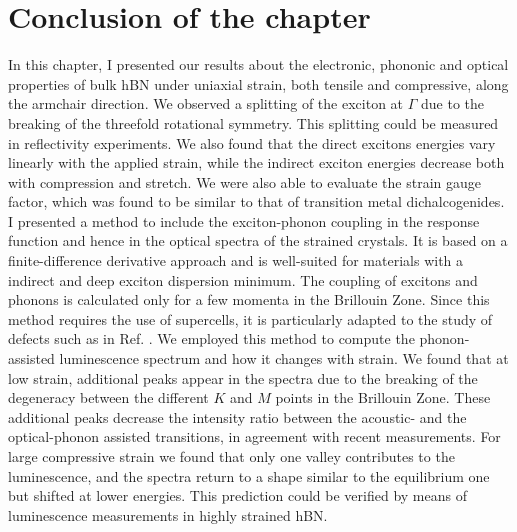 %
\section*{Conclusion of the chapter}
In this chapter, I presented our results about the electronic, phononic and optical properties of bulk hBN under uniaxial strain, both tensile and compressive, along the armchair direction. We observed a splitting of the exciton at $\Gamma$ due to the breaking
of the threefold rotational symmetry. This splitting could be measured in reflectivity experiments.\cite{elias2021flat} We also found that the direct excitons energies vary linearly with the applied strain, while the indirect exciton energies decrease both with compression and stretch. We were also able to evaluate the strain gauge factor, which was found to be similar to that of transition metal dichalcogenides.
I presented a method to include the exciton-phonon coupling in the response function and hence in the optical spectra of the strained crystals. It is based on a finite-difference derivative approach and is well-suited for materials with a indirect and deep exciton dispersion minimum. The coupling of excitons and phonons is calculated only for a few momenta in the Brillouin Zone. Since this method requires the use of supercells, it is particularly adapted to the study of defects such as in Ref. \cite{libbi2022phonon}. We employed this method to compute the phonon-assisted luminescence spectrum and how it changes with strain. We found that at low strain, additional peaks appear in the spectra due to the breaking of the degeneracy between the different $K$ and $M$ points in the Brillouin Zone. These additional peaks decrease the intensity ratio between the acoustic- and the optical-phonon assisted transitions, in agreement with recent measurements. For large compressive strain we found that only one valley contributes to the luminescence, and the spectra return to a shape similar to the equilibrium one but shifted at lower energies. This prediction could be verified by means of luminescence measurements in highly strained \acrshort{hBN}.\cite{blundo2022vibrational}
